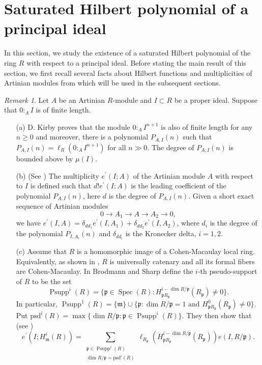 \documentclass{amsart}
\theoremstyle {definition}
\theoremstyle {remark}
\newtheorem{remark}[theorem]{Remark}
\begin{document}
\section{Saturated Hilbert polynomial of a principal ideal}

In this section, we study the existence of a saturated Hilbert polynomial of the ring $R$ with respect to a principal ideal. Before stating the main result of this section, we first recall several facts about Hilbert functions and multiplicities of Artinian modules from \cite{Kir, NTCNhan} which will be used in the subsequent sections.

\begin{remark}\label{21} Let $A$ be an Artinian $R$-module and $I\subset R$ be a proper ideal. Suppose that $0:_AI$ is of finite length.
\begin{enumerate}
\item[(a)] D. Kirby \cite[Proposition 2]{Kir} proves that the module $0:_AI^{n+1}$ is also of finite length for any $n\geq 0$ and moreover, there is a polynomial $P_{A, I}(n)$ such that $P_{A, I}(n)=\ell_R(0:_AI^{n+1})$ for all $n\gg 0$. The degree of $P_{A, I}(n)$ is bounded above by $\mu(I)$.
\item[(b)] (See \cite{NTCNhan}) The multiplicity $e^\prime(I; A)$ of the Artinian module $A$ with respect to $I$ is defined such that $d!e^\prime(I;A)$ is the leading coefficient of the polynomial $P_{A, I}(n)$, here $d$ is the degree of $P_{A, I}(n)$. Given a short exact sequence of Artinian modules
$$0\rightarrow A_1\rightarrow A\rightarrow A_2\rightarrow 0,$$
we have $e^\prime(I, A)=\delta_{dd_1}e^\prime(I, A_1)+\delta_{dd_2}e^\prime(I, A_2)$, where $d_i$ is the degree of the polynomial $P_{I, A_i}(n)$ and $\delta_{dd_i}$ is the Kronecker delta, $i=1, 2$.
\item[(c)] Assume that $R$ is a homomorphic image of a Cohen-Macaulay local ring. Equivalently, as shown in \cite{NTCDTC2}, $R$ is universally catenary and all its formal fibers are Cohen-Macaulay. In \cite{BS1} Brodmann and Sharp define the $i$-th pseudo-support of $R$ to be the set
$${\operatorname{Psupp}}^i(R)=\{{\ensuremath{\mathfrak p}}\in {\operatorname{Spec}}(R): H^{i-\dim R/{\ensuremath{\mathfrak p}}}_{{\ensuremath{\mathfrak p}} R_{\ensuremath{\mathfrak p}}}(R_{\ensuremath{\mathfrak p}})\not=0\}.$$
In particular, ${\operatorname{Psupp}}^1(R)=\{{\ensuremath{\mathfrak m}}\}\cup\{{\ensuremath{\mathfrak p}}:
\dim R/{\ensuremath{\mathfrak p}}=1 \text{ and }H^0_{{\ensuremath{\mathfrak p}} R_{\ensuremath{\mathfrak p}}}(R_{\ensuremath{\mathfrak p}})\not=0\}$. Put $\mathrm{psd}^i(R)=\max\{\dim R/{\ensuremath{\mathfrak p}}: {\ensuremath{\mathfrak p}}\in {\operatorname{Psupp}}^i(R)\}$. They then show that (see \cite[Theorem 2.4]{BS1})
$$e^\prime(I; H^i_{\ensuremath{\mathfrak m}}(R))=\sum_{\substack{{\ensuremath{\mathfrak p}}\in{\operatorname{Psupp}}^i(R)\\ \dim R/{\ensuremath{\mathfrak p}}=\mathrm{psd}^i(R)}}\ell_{R_{\ensuremath{\mathfrak p}}}(H^{i-\dim R/{\ensuremath{\mathfrak p}}}_{{\ensuremath{\mathfrak p}} R_{\ensuremath{\mathfrak p}}}(R_{\ensuremath{\mathfrak p}}))e(I, R/{\ensuremath{\mathfrak p}}).$$
\end{enumerate}
\end{remark}
\end{document}
